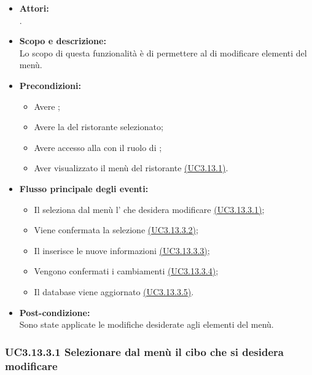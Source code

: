 \begin{itemize}
	\item \textbf{Attori:}
	\\.
	\item \textbf{Scopo e descrizione:} 
	\\Lo scopo di questa funzionalità è di permettere al  di modificare elementi del menù.
	\item \textbf{Precondizioni:}
	\begin{itemize}
		\item Avere ;
		\item Avere la  del ristorante selezionato;
		\item Avere accesso alla  con il ruolo di ;
		\item Aver visualizzato il menù del ristorante \hyperref[UC3.13.1]{(UC3.13.1)}.
	\end{itemize}
	\item \textbf{Flusso principale degli eventi:}
	\begin{itemize}
		\item Il  seleziona dal menù l' che desidera modificare \hyperref[UC3.13.3.1]{(UC3.13.3.1)};
		\item Viene confermata la selezione \hyperref[UC3.13.3.2]{(UC3.13.3.2)};
		\item Il  inserisce le nuove informazioni \hyperref[UC3.13.3.3]{(UC3.13.3.3)};
		\item Vengono confermati i cambiamenti \hyperref[UC3.13.3.4]{(UC3.13.3.4)};
		\item Il database viene aggiornato \hyperref[UC3.13.3.5]{(UC3.13.3.5)}.
	\end{itemize}
	\item \textbf{Post-condizione:}
	\\Sono state applicate le modifiche desiderate agli elementi del menù.
\end{itemize}

\subsubsection{UC3.13.3.1  Selezionare dal menù il cibo che si desidera modificare} \label{UC3.13.3.1}

